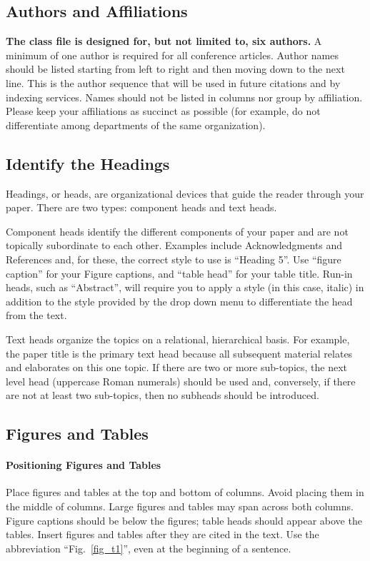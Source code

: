 \documentclass[conference]{IEEEtran}
\begin{document}
\subsection{Authors and Affiliations}\label{AAA}
\textbf{The class file is designed for, but not limited to, six authors.} A 
minimum of one author is required for all conference articles. Author names 
should be listed starting from left to right and then moving down to the 
next line. This is the author sequence that will be used in future citations 
and by indexing services. Names should not be listed in columns nor group by 
affiliation. Please keep your affiliations as succinct as possible (for 
example, do not differentiate among departments of the same organization).

\subsection{Identify the Headings}\label{ITH}
Headings, or heads, are organizational devices that guide the reader through 
your paper. There are two types: component heads and text heads.

Component heads identify the different components of your paper and are not 
topically subordinate to each other. Examples include Acknowledgments and 
References and, for these, the correct style to use is ``Heading 5''. Use 
``figure caption'' for your Figure captions, and ``table head'' for your 
table title. Run-in heads, such as ``Abstract'', will require you to apply a 
style (in this case, italic) in addition to the style provided by the drop 
down menu to differentiate the head from the text.

Text heads organize the topics on a relational, hierarchical basis. For 
example, the paper title is the primary text head because all subsequent 
material relates and elaborates on this one topic. If there are two or more 
sub-topics, the next level head (uppercase Roman numerals) should be used 
and, conversely, if there are not at least two sub-topics, then no subheads 
should be introduced.

\subsection{Figures and Tables}\label{FAT}
\paragraph{Positioning Figures and Tables} Place figures and tables at the top and 
bottom of columns. Avoid placing them in the middle of columns. Large 
figures and tables may span across both columns. Figure captions should be 
below the figures; table heads should appear above the tables. Insert 
figures and tables after they are cited in the text. Use the abbreviation 
``Fig.~\ref{fig_t1}'', even at the beginning of a sentence.
\end{document}
